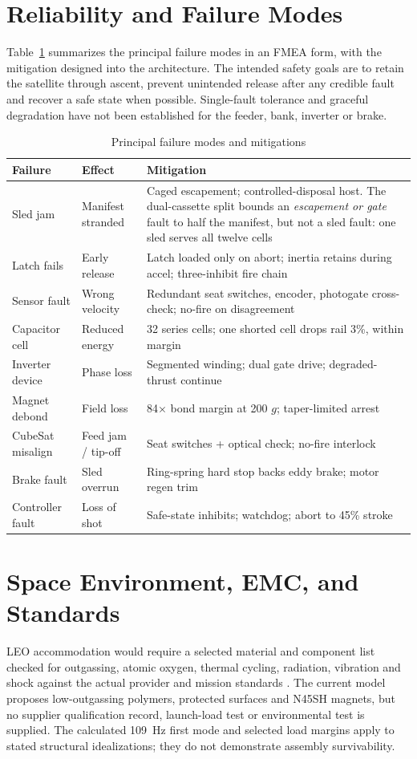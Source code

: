 \documentclass[conference]{IEEEtran}
\begin{document}
\section{Reliability and Failure Modes}\label{sec:fmea}
Table~\ref{tab:fmea} summarizes the principal failure modes in an FMEA form, with the mitigation designed into the architecture. The intended safety goals are to retain the satellite through ascent, prevent unintended release after any credible fault and recover a safe state when possible. Single-fault tolerance and graceful degradation have not been established for the feeder, bank, inverter or brake.

\begin{table}[t]
\caption{Principal failure modes and mitigations}
\label{tab:fmea}
\centering\footnotesize
\begin{tabular}{p{1.5cm}p{1.4cm}p{4.2cm}}
\toprule
Failure & Effect & Mitigation\\
\midrule
Sled jam & Manifest stranded & Caged escapement; controlled-disposal host. The dual-cassette split bounds an \emph{escapement or gate} fault to half the manifest, but not a sled fault: one sled serves all twelve cells\\
Latch fails & Early release & Latch loaded only on abort; inertia retains during accel; three-inhibit fire chain\\
Sensor fault & Wrong velocity & Redundant seat switches, encoder, photogate cross-check; no-fire on disagreement\\
Capacitor cell & Reduced energy & 32 series cells; one shorted cell drops rail 3\%, within margin\\
Inverter device & Phase loss & Segmented winding; dual gate drive; degraded-thrust continue\\
Magnet debond & Field loss & 84$\times$ bond margin at 200 $g$; taper-limited arrest\\
CubeSat misalign & Feed jam / tip-off & Seat switches + optical check; no-fire interlock\\
Brake fault & Sled overrun & Ring-spring hard stop backs eddy brake; motor regen trim\\
Controller fault & Loss of shot & Safe-state inhibits; watchdog; abort to 45\% stroke\\
\bottomrule
\end{tabular}
\end{table}

\section{Space Environment, EMC, and Standards}\label{sec:env}
LEO accommodation would require a selected material and component list checked for outgassing, atomic oxygen, thermal cycling, radiation, vibration and shock against the actual provider and mission standards \cite{ecss}. The current model proposes low-outgassing polymers, protected surfaces and N45SH magnets, but no supplier qualification record, launch-load test or environmental test is supplied. The calculated 109~Hz first mode and selected load margins apply to stated structural idealizations; they do not demonstrate assembly survivability.
\end{document}
